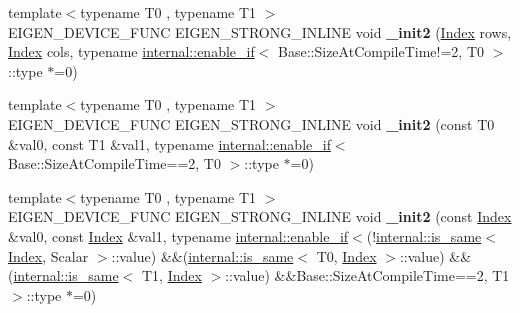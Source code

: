 \begin{DoxyCompactItemize}
\item 
\mbox{\label{class_eigen_1_1_plain_object_base_ac919a0a42914a190ba025fb8a3467c6b}} 
{\footnotesize template$<$typename T0 , typename T1 $>$ }\\E\+I\+G\+E\+N\+\_\+\+D\+E\+V\+I\+C\+E\+\_\+\+F\+U\+NC E\+I\+G\+E\+N\+\_\+\+S\+T\+R\+O\+N\+G\+\_\+\+I\+N\+L\+I\+NE void {\bfseries \+\_\+init2} (\hyperlink{namespace_eigen_a62e77e0933482dafde8fe197d9a2cfde}{Index} rows, \hyperlink{namespace_eigen_a62e77e0933482dafde8fe197d9a2cfde}{Index} cols, typename \hyperlink{struct_eigen_1_1internal_1_1enable__if}{internal\+::enable\+\_\+if}$<$ Base\+::\+Size\+At\+Compile\+Time!=2, T0 $>$\+::type $\ast$=0)
\item 
\mbox{\label{class_eigen_1_1_plain_object_base_adf6cee011f287daa6488e269c80f3c1c}} 
{\footnotesize template$<$typename T0 , typename T1 $>$ }\\E\+I\+G\+E\+N\+\_\+\+D\+E\+V\+I\+C\+E\+\_\+\+F\+U\+NC E\+I\+G\+E\+N\+\_\+\+S\+T\+R\+O\+N\+G\+\_\+\+I\+N\+L\+I\+NE void {\bfseries \+\_\+init2} (const T0 \&val0, const T1 \&val1, typename \hyperlink{struct_eigen_1_1internal_1_1enable__if}{internal\+::enable\+\_\+if}$<$ Base\+::\+Size\+At\+Compile\+Time==2, T0 $>$\+::type $\ast$=0)
\item 
\mbox{\label{class_eigen_1_1_plain_object_base_a2847adb1d1c4f388541cc36db1e3349d}} 
{\footnotesize template$<$typename T0 , typename T1 $>$ }\\E\+I\+G\+E\+N\+\_\+\+D\+E\+V\+I\+C\+E\+\_\+\+F\+U\+NC E\+I\+G\+E\+N\+\_\+\+S\+T\+R\+O\+N\+G\+\_\+\+I\+N\+L\+I\+NE void {\bfseries \+\_\+init2} (const \hyperlink{namespace_eigen_a62e77e0933482dafde8fe197d9a2cfde}{Index} \&val0, const \hyperlink{namespace_eigen_a62e77e0933482dafde8fe197d9a2cfde}{Index} \&val1, typename \hyperlink{struct_eigen_1_1internal_1_1enable__if}{internal\+::enable\+\_\+if}$<$(!\hyperlink{struct_eigen_1_1internal_1_1is__same}{internal\+::is\+\_\+same}$<$ \hyperlink{namespace_eigen_a62e77e0933482dafde8fe197d9a2cfde}{Index}, Scalar $>$\+::value) \&\&(\hyperlink{struct_eigen_1_1internal_1_1is__same}{internal\+::is\+\_\+same}$<$ T0, \hyperlink{namespace_eigen_a62e77e0933482dafde8fe197d9a2cfde}{Index} $>$\+::value) \&\&(\hyperlink{struct_eigen_1_1internal_1_1is__same}{internal\+::is\+\_\+same}$<$ T1, \hyperlink{namespace_eigen_a62e77e0933482dafde8fe197d9a2cfde}{Index} $>$\+::value) \&\&Base\+::\+Size\+At\+Compile\+Time==2, T1 $>$\+::type $\ast$=0)

\end{DoxyCompactItemize}
